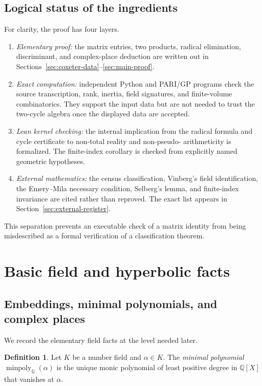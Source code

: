 \documentclass[11pt]{article}
\numberwithin{equation}{section}
\theoremstyle{definition}
\newtheorem{definition}[theorem]{Definition}
\theoremstyle{remark}
\newcommand{\Q}{\mathbb{Q}}
\newcommand{\minpoly}{\operatorname{minpoly}}
\begin{document}
\subsection{Logical status of the ingredients}
\label{subsec:logical-status}

For clarity, the proof has four layers.

\begin{enumerate}[label=\textbf{L\arabic*.},leftmargin=3em]
\item \emph{Elementary proof:} the matrix entries, two products, radical
  elimination, discriminant, and complex-place deduction are written out in
  Sections~\ref{sec:coxeter-data}--\ref{sec:main-proof}.
\item \emph{Exact computation:} independent Python and PARI/GP programs check
  the source transcription, rank, inertia, field signatures, and finite-volume
  combinatorics.  They support the input data but are not needed to trust the
  two-cycle algebra once the displayed data are accepted.
\item \emph{Lean kernel checking:} the internal implication from the radical
  formula and cycle certificate to non-total reality and non-pseudo-
  arithmeticity is formalized.  The finite-index corollary is checked from
  explicitly named geometric hypotheses.
\item \emph{External mathematics:} the census classification, Vinberg's
  field identification, the Emery--Mila necessary condition, Selberg's lemma,
  and finite-index invariance are cited rather than reproved.  The exact list
  appears in Section~\ref{sec:external-register}.
\end{enumerate}

This separation prevents an executable check of a matrix identity from being
misdescribed as a formal verification of a classification theorem.

\section{Basic field and hyperbolic facts}
\label{sec:basics}

\subsection{Embeddings, minimal polynomials, and complex places}

We record the elementary field facts at the level needed later.

\begin{definition}
Let \(K\) be a number field and \(\alpha\in K\).  The \emph{minimal
polynomial} \(\minpoly_\Q(\alpha)\) is the unique monic polynomial of least
positive degree in \(\Q[X]\) that vanishes at \(\alpha\).
\end{definition}
\end{document}
